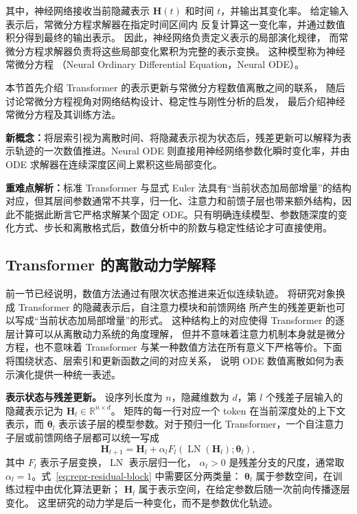 其中，神经网络接收当前隐藏表示
\(\boldsymbol{H}(t)\)
和时间 \(t\)，并输出其变化率。
给定输入表示后，常微分方程求解器在指定时间区间内
反复计算这一变化率，并通过数值积分得到最终的输出表示。
因此，神经网络负责定义表示的局部演化规律，
而常微分方程求解器负责将这些局部变化累积为完整的表示变换。
这种模型称为神经常微分方程
（Neural Ordinary Differential Equation，Neural ODE）。

本节首先介绍 Transformer 的表示更新与常微分方程数值离散之间的联系，
随后讨论常微分方程视角对网络结构设计、稳定性与刚性分析的启发，
最后介绍神经常微分方程及其训练方法。

\begin{importantnote}
\textbf{新概念：}将层索引视为离散时间、将隐藏表示视为状态后，残差更新可以解释为表示轨迹的一次数值推进。Neural ODE 则直接用神经网络参数化瞬时变化率，并由 ODE 求解器在连续深度区间上累积这些局部变化。

\textbf{重难点解析：}标准 Transformer 与显式 Euler 法具有“当前状态加局部增量”的结构对应，但其层间参数通常不共享，归一化、注意力和前馈子层也带来额外结构，因此不能据此断言它严格求解某个固定 ODE。只有明确连续模型、参数随深度的变化方式、步长和离散格式后，数值分析中的阶数与稳定性结论才可直接使用。
\end{importantnote}

\subsection{Transformer 的离散动力学解释}

前一节已经说明，数值方法通过有限次状态推进来近似连续轨迹。
将研究对象换成 Transformer 的隐藏表示后，自注意力模块和前馈网络
所产生的残差更新也可以写成“当前状态加局部增量”的形式。
这种结构上的对应使得 Transformer 的逐层计算可以从离散动力系统的角度理解，
但并不意味着注意力机制本身就是微分方程，也不意味着 Transformer
与某一种数值方法在所有意义下严格等价。下面将围绕状态、层索引和更新函数之间的对应关系，
说明 ODE 数值离散如何为表示演化提供一种统一表述。

\textbf{表示状态与残差更新。}
设序列长度为 \(n\)，隐藏维数为 \(d\)，第 \(l\) 个残差子层输入的
隐藏表示记为
\(\boldsymbol{H}_{l}\in\mathbb{R}^{n\times d}\)。
矩阵的每一行对应一个 token 在当前深度处的上下文表示，而
\(\boldsymbol{\theta}_{l}\) 表示该子层的模型参数。对于预归一化
Transformer，一个自注意力子层或前馈网络子层都可以统一写成
\begin{equation}
    \boldsymbol{H}_{l+1}
    =
    \boldsymbol{H}_{l}
    +
    \alpha_l
    F_l\!\left(
        \operatorname{LN}(\boldsymbol{H}_{l});
        \boldsymbol{\theta}_{l}
    \right),
    \label{eq:repr-residual-block}
\end{equation}
其中 \(F_l\) 表示子层变换，\(\operatorname{LN}\) 表示层归一化，
\(\alpha_l>0\) 是残差分支的尺度，通常取
\(\alpha_l=1\)。式~\eqref{eq:repr-residual-block} 中需要区分两类量：
\(\boldsymbol{\theta}_{l}\) 属于参数空间，在训练过程中由优化算法更新；
\(\boldsymbol{H}_{l}\) 属于表示空间，在给定参数后随一次前向传播逐层变化。
这里研究的动力学是后一种变化，而不是参数优化轨迹。

